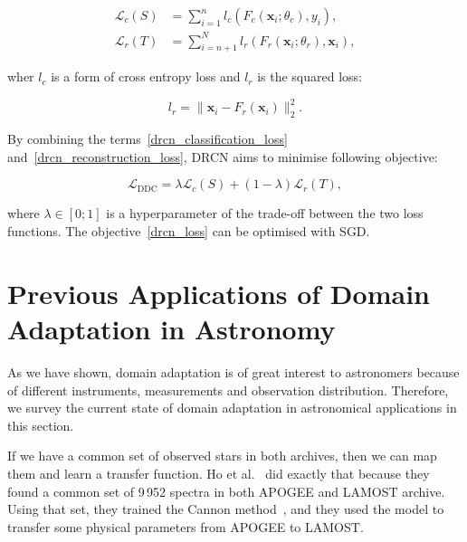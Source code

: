 \begin{align}
	\mathcal{L}_c(S) &= \sum_{i = 1}^{n}
	l_c(F_c(\mathbf{x}_i; \theta_c), y_i),
	\label{drcn_classification_loss} \\
	\mathcal{L}_r(T) &= \sum_{i = n + 1}^{N}
	l_r(F_r(\mathbf{x}_i; \theta_r), \mathbf{x}_i),
	\label{drcn_reconstruction_loss}
\end{align}

wher \(l_c\) is a form of cross entropy loss
and \(l_r\) is the squared loss:

\begin{equation}
	l_r = \|\mathbf{x}_i - F_r(\mathbf{x}_i)\|_2^2.
\end{equation}

By combining the terms~\ref{drcn_classification_loss} and~\ref{drcn_reconstruction_loss},
DRCN aims to minimise following objective:

\begin{equation}
	\mathcal{L}_{\mathrm{DDC}}
	= \lambda \mathcal{L}_c(S) + (1 - \lambda) \mathcal{L}_r(T),
	\label{drcn_loss}
\end{equation}

where \(\lambda \in [0; 1]\) is a hyperparameter of the trade-off between the two loss functions.
The objective~\ref{drcn_loss} can be optimised with SGD.

\section{Previous Applications of Domain Adaptation in Astronomy}


As we have shown, domain adaptation is of great interest to astronomers
because of different instruments, measurements and observation distribution.
Therefore, we survey the current state of domain adaptation in astronomical applications in this section.

If we have a common set of observed stars in both archives,
then we can map them and learn a transfer function.
Ho et al.~\cite{ho2017} did exactly that
because they found a common set of 9\,952 spectra in both APOGEE and LAMOST archive.
Using that set, they trained the Cannon method~\cite{ness2015},
and they used the model to transfer some physical parameters from APOGEE to LAMOST.

